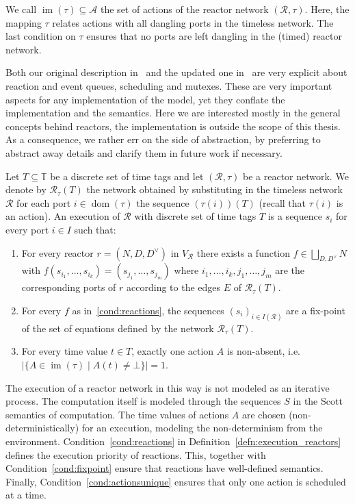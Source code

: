 We call $\operatorname{im}(\tau) \subseteq \mathcal{A}$ the set of actions of the reactor network $(\mathcal{R},\tau)$.
Here, the mapping $\tau$ relates actions with all dangling ports in the timeless network.
The last condition on $\tau$ ensures that no ports are left dangling in the (timed) reactor network.

Both our original description in~\cite{lohstroh_cyphy19} and the updated one in~\cite{lohstroh_phdthesis} are very explicit about reaction and event queues, scheduling and mutexes.
These are very important aspects for any implementation of the model, yet they conflate the implementation and the semantics.
Here we are interested mostly in the general concepts behind reactors, the implementation is outside the scope of this thesis.
As a consequence, we rather err on the side of abstraction, by preferring to abstract away details and clarify them in future work if necessary. 

\begin{defn}
    \label{defn:execution_reactors}
Let $T \subseteq \mathbb{T}$ be a discrete set of time tags and let $(\mathcal{R},\tau)$ be a reactor network.
We denote by $\mathcal{R}_\tau(T)$ the network obtained by substituting in the timeless network $\mathcal{R}$ for each port $i \in \operatorname{dom}(\tau)$ the sequence $(\tau(i))(T)$ (recall that $\tau(i)$ is an action).
An execution of $\mathcal{R}$ with discrete set of time tags $T$ is a sequence $s_i$ for every port $i \in I$ such that: 
\begin{enumerate}
    \item\label{cond:reactions} For every reactor $r = (N,D,D^\vee)$ in $V_\mathcal{R}$ there exists a function $f \in \bigsqcup_{D,D^\vee}N$ with $f(s_{i_1},\ldots,s_{i_k}) = (s_{j_1},\ldots,s_{j_m})$ where $i_1,\ldots,i_k,j_1,\ldots,j_m$ are the corresponding ports of $r$ according to the edges $E$ of $\mathcal{R}_\tau(T)$.
    \item\label{cond:fixpoint} For every $f$ as in~\ref{cond:reactions}, the sequences $(s_i)_{i \in I(\mathcal{R})}$ are a fix-point of the set of equations defined by the network $\mathcal{R}_\tau(T)$.
    \item\label{cond:actionsunique} For every time value $t \in T$, exactly one action $A$ is non-absent, i.e. $| \{ A  \in \operatorname{im}(\tau) \mid A(t) \neq \bot \}| = 1$.
\end{enumerate}
\end{defn}

The execution of a reactor network in this way is not modeled as an iterative process.
The computation itself is modeled through the sequences $S$ in the Scott semantics of computation.
The time values of actions $A$ are chosen (non-deterministically) for an execution, modeling the non-determinism from the environment.
Condition~\ref{cond:reactions} in Definition~\ref{defn:execution_reactors} defines the execution priority of reactions. This, together with Condition~\ref{cond:fixpoint} ensure that reactions have well-defined semantics.
Finally, Condition~\ref{cond:actionsunique} ensures that only one action is scheduled at a time.

